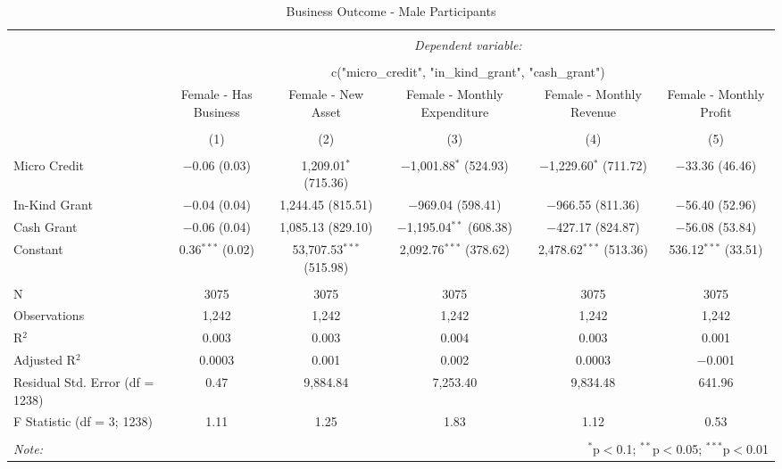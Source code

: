 
\begin{table}[!htbp] \centering 
  \caption{Business Outcome - Male Participants} 
  \label{} 
\small 
\begin{tabular}{@{\extracolsep{5pt}}lccccc} 
\\[-1.8ex]\hline 
\hline \\[-1.8ex] 
 & \multicolumn{5}{c}{\textit{Dependent variable:}} \\ 
\cline{2-6} 
\\[-1.8ex] & \multicolumn{5}{c}{c("micro\_credit", "in\_kind\_grant", "cash\_grant")} \\ 
 & Female - Has Business & Female - New Asset & Female - Monthly Expenditure & Female - Monthly Revenue & Female - Monthly Profit \\ 
\\[-1.8ex] & (1) & (2) & (3) & (4) & (5)\\ 
\hline \\[-1.8ex] 
 Micro Credit & $-$0.06 (0.03) & 1,209.01$^{*}$ (715.36) & $-$1,001.88$^{*}$ (524.93) & $-$1,229.60$^{*}$ (711.72) & $-$33.36 (46.46) \\ 
  In-Kind Grant & $-$0.04 (0.04) & 1,244.45 (815.51) & $-$969.04 (598.41) & $-$966.55 (811.36) & $-$56.40 (52.96) \\ 
  Cash Grant & $-$0.06 (0.04) & 1,085.13 (829.10) & $-$1,195.04$^{**}$ (608.38) & $-$427.17 (824.87) & $-$56.08 (53.84) \\ 
  Constant & 0.36$^{***}$ (0.02) & 53,707.53$^{***}$ (515.98) & 2,092.76$^{***}$ (378.62) & 2,478.62$^{***}$ (513.36) & 536.12$^{***}$ (33.51) \\ 
 \hline \\[-1.8ex] 
N & 3075 & 3075 & 3075 & 3075 & 3075 \\ 
Observations & 1,242 & 1,242 & 1,242 & 1,242 & 1,242 \\ 
R$^{2}$ & 0.003 & 0.003 & 0.004 & 0.003 & 0.001 \\ 
Adjusted R$^{2}$ & 0.0003 & 0.001 & 0.002 & 0.0003 & $-$0.001 \\ 
Residual Std. Error (df = 1238) & 0.47 & 9,884.84 & 7,253.40 & 9,834.48 & 641.96 \\ 
F Statistic (df = 3; 1238) & 1.11 & 1.25 & 1.83 & 1.12 & 0.53 \\ 
\hline 
\hline \\[-1.8ex] 
\textit{Note:}  & \multicolumn{5}{r}{$^{*}$p$<$0.1; $^{**}$p$<$0.05; $^{***}$p$<$0.01} \\ 
\end{tabular} 
\end{table} 
